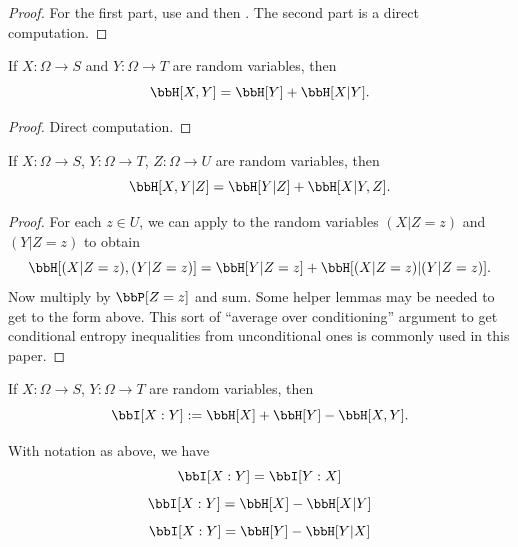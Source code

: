 \begin{proof}\leanok
  For the first part, use  and then .  The second part is a direct computation.
\end{proof}


\begin{lemma}\label{chain-rule}
  \leanok
  If $X: \Omega \to S$ and $Y: \Omega \to T$ are random variables, then
  $$ \bbH[X, Y] = \bbH[Y] + \bbH[X|Y].$$
  \end{lemma}
  \begin{proof}
  \leanok
  Direct computation.
\end{proof}

\begin{lemma}\label{conditional-chain-rule}
  \leanok
  If $X: \Omega \to S$, $Y: \Omega \to T$, $Z: \Omega \to U$ are random variables, then
$$ \bbH[X, Y | Z] = \bbH[Y | Z] + \bbH[X|Y, Z].$$
\end{lemma}

\begin{proof}\leanok
   For each $z \in U$, we can apply  to the random variables $(X|Z=z)$ and $(Y|Z=z)$ to obtain
  $$ \bbH[(X|Z=z),(Y|Z=z)] = \bbH[Y|Z=z] + \bbH[(X|Z=z)|(Y|Z=z)].$$
  Now multiply by $\bbP[Z=z]$ and sum.  Some helper lemmas may be needed to get to the form above.  This sort of ``average over conditioning'' argument to get conditional entropy inequalities from unconditional ones is commonly used in this paper.
\end{proof}

\begin{definition}
  \label{information-def}
  \leanok
  If $X: \Omega \to S$, $Y: \Omega \to T$ are random variables, then
  $$\bbI[X : Y] := \bbH[X] + \bbH[Y] - \bbH[X,Y].$$
\end{definition}

\begin{lemma}
  \label{alternative-mutual}
  \leanok
  With notation as above, we have
  $$  \bbI[X : Y] = \bbI[Y:X]$$
  $$  \bbI[X : Y] = \bbH[X] - \bbH[X|Y]$$
  $$  \bbI[X : Y] = \bbH[Y] - \bbH[Y|X]$$
\end{lemma}

